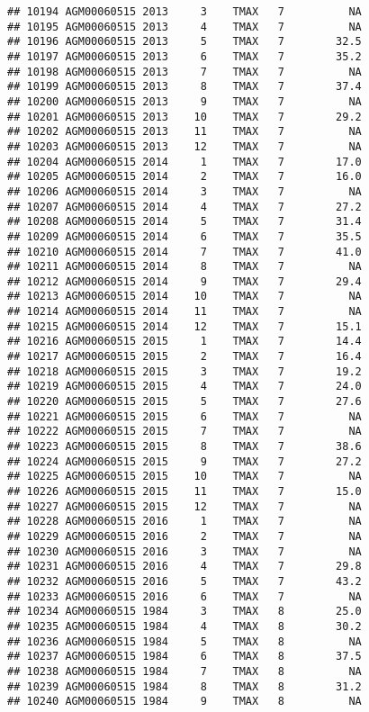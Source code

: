 \documentclass{article}\usepackage[]{graphicx}\usepackage[]{color}
\makeatletter
\newenvironment{kframe}{%
 \def\at@end@of@kframe{}%
 \ifinner\ifhmode%
  \def\at@end@of@kframe{\end{minipage}}%
  \begin{minipage}{\columnwidth}%
 \fi\fi%
 \def\FrameCommand##1{\hskip\@totalleftmargin \hskip-\fboxsep
 \colorbox{shadecolor}{##1}\hskip-\fboxsep
     \hskip-\linewidth \hskip-\@totalleftmargin \hskip\columnwidth}%
 \MakeFramed {\advance\hsize-\width
   \@totalleftmargin\z@ \linewidth\hsize
   \@setminipage}}%
 {\par\unskip\endMakeFramed%
 \at@end@of@kframe}
\newenvironment{knitrout}{}{} %
\makeatother
\begin{document}
\begin{knitrout}
\begin{kframe}
\begin{verbatim}
## 10194 AGM00060515 2013     3    TMAX   7          NA
## 10195 AGM00060515 2013     4    TMAX   7          NA
## 10196 AGM00060515 2013     5    TMAX   7        32.5
## 10197 AGM00060515 2013     6    TMAX   7        35.2
## 10198 AGM00060515 2013     7    TMAX   7          NA
## 10199 AGM00060515 2013     8    TMAX   7        37.4
## 10200 AGM00060515 2013     9    TMAX   7          NA
## 10201 AGM00060515 2013    10    TMAX   7        29.2
## 10202 AGM00060515 2013    11    TMAX   7          NA
## 10203 AGM00060515 2013    12    TMAX   7          NA
## 10204 AGM00060515 2014     1    TMAX   7        17.0
## 10205 AGM00060515 2014     2    TMAX   7        16.0
## 10206 AGM00060515 2014     3    TMAX   7          NA
## 10207 AGM00060515 2014     4    TMAX   7        27.2
## 10208 AGM00060515 2014     5    TMAX   7        31.4
## 10209 AGM00060515 2014     6    TMAX   7        35.5
## 10210 AGM00060515 2014     7    TMAX   7        41.0
## 10211 AGM00060515 2014     8    TMAX   7          NA
## 10212 AGM00060515 2014     9    TMAX   7        29.4
## 10213 AGM00060515 2014    10    TMAX   7          NA
## 10214 AGM00060515 2014    11    TMAX   7          NA
## 10215 AGM00060515 2014    12    TMAX   7        15.1
## 10216 AGM00060515 2015     1    TMAX   7        14.4
## 10217 AGM00060515 2015     2    TMAX   7        16.4
## 10218 AGM00060515 2015     3    TMAX   7        19.2
## 10219 AGM00060515 2015     4    TMAX   7        24.0
## 10220 AGM00060515 2015     5    TMAX   7        27.6
## 10221 AGM00060515 2015     6    TMAX   7          NA
## 10222 AGM00060515 2015     7    TMAX   7          NA
## 10223 AGM00060515 2015     8    TMAX   7        38.6
## 10224 AGM00060515 2015     9    TMAX   7        27.2
## 10225 AGM00060515 2015    10    TMAX   7          NA
## 10226 AGM00060515 2015    11    TMAX   7        15.0
## 10227 AGM00060515 2015    12    TMAX   7          NA
## 10228 AGM00060515 2016     1    TMAX   7          NA
## 10229 AGM00060515 2016     2    TMAX   7          NA
## 10230 AGM00060515 2016     3    TMAX   7          NA
## 10231 AGM00060515 2016     4    TMAX   7        29.8
## 10232 AGM00060515 2016     5    TMAX   7        43.2
## 10233 AGM00060515 2016     6    TMAX   7          NA
## 10234 AGM00060515 1984     3    TMAX   8        25.0
## 10235 AGM00060515 1984     4    TMAX   8        30.2
## 10236 AGM00060515 1984     5    TMAX   8          NA
## 10237 AGM00060515 1984     6    TMAX   8        37.5
## 10238 AGM00060515 1984     7    TMAX   8          NA
## 10239 AGM00060515 1984     8    TMAX   8        31.2
## 10240 AGM00060515 1984     9    TMAX   8          NA

\end{verbatim}
\end{kframe}
\end{knitrout}
\end{document}
